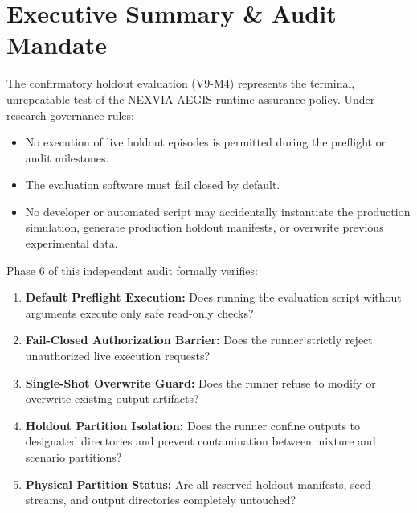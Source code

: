 \documentclass[10pt,a4paper]{article}
\begin{document}
\section{Executive Summary \& Audit Mandate}
The confirmatory holdout evaluation (V9-M4) represents the terminal, unrepeatable test of the NEXVIA AEGIS runtime assurance policy. Under research governance rules:
\begin{itemize}
    \item No execution of live holdout episodes is permitted during the preflight or audit milestones.
    \item The evaluation software must fail closed by default.
    \item No developer or automated script may accidentally instantiate the production simulation, generate production holdout manifests, or overwrite previous experimental data.
\end{itemize}
Phase 6 of this independent audit formally verifies:
\begin{enumerate}
    \item \textbf{Default Preflight Execution:} Does running the evaluation script without arguments execute only safe read-only checks?
    \item \textbf{Fail-Closed Authorization Barrier:} Does the runner strictly reject unauthorized live execution requests?
    \item \textbf{Single-Shot Overwrite Guard:} Does the runner refuse to modify or overwrite existing output artifacts?
    \item \textbf{Holdout Partition Isolation:} Does the runner confine outputs to designated directories and prevent contamination between mixture and scenario partitions?
    \item \textbf{Physical Partition Status:} Are all reserved holdout manifests, seed streams, and output directories completely untouched?
\end{enumerate}
\end{document}
